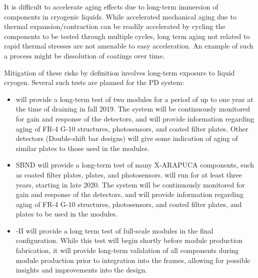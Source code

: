 
It is difficult to accelerate aging effects due to long-term immersion of components in cryogenic liquids.  While accelerated mechanical aging due to thermal expansion/contraction can be readily accelerated by cycling the components to be tested through multiple cycles, long term aging not related to rapid thermal stresses are not amenable to easy acceleration.  An example of such a process might be dissolution of  coatings over time.

Mitigation of these risks by definition involves long-term exposure to liquid cryogen.  Several such tests are planned for the PD system:

\begin{itemize}

    \item {} will provide a long-term test of two  modules for a period of up to one year at the time of draining in fall 2019.  The system will be continuously monitored for gain and response of the detectors, and will provide information regarding aging of FR-4 G-10 structures, photosensors, and coated filter plates.  Other  detectors (Double-shift bar designs) will give some indication of aging of similar  plates to those used in the  modules.
    \item SBND will provide a long-term test of many X-ARAPUCA components, such as coated filter plates,  plates, and photosensors.   will run for at least three years, starting in late 2020.  The system will be continuously monitored for gain and response of the detectors, and will provide information regarding aging of FR-4 G-10 structures, photosensors, and coated filter plates, and  plates to be used in the  modules.
    \item {}-II will provide a long term test of full-scale  modules in the final  configuration. While this test will begin shortly before   module production fabrication, it will provide long-term validation of all  components during module production prior to integration into the  frames, allowing for possible insights and improvements into the  design.

\end{itemize}


